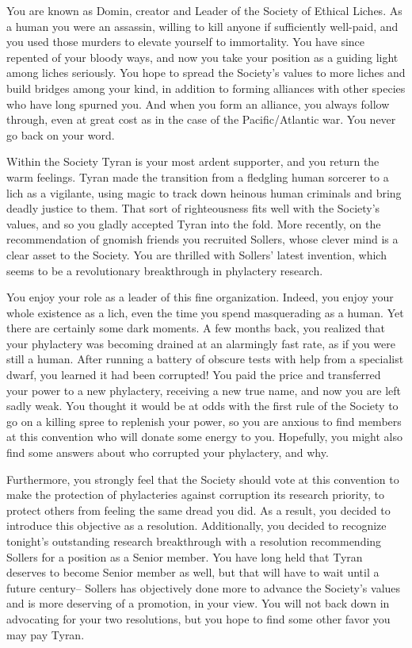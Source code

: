 \documentclass[char]{Sel}
\begin{document}
\name{\cDomin{}}


You are known as Domin, creator and Leader of the Society of Ethical Liches. As a human you were an assassin, willing to kill anyone if sufficiently well-paid, and you used those murders to elevate yourself to immortality. You have since repented of your bloody ways, and now you take your position as a guiding light among liches seriously. You hope to spread the Society's values to more liches and build bridges among your kind, in addition to forming alliances with other species who have long spurned you. And when you form an alliance, you always follow through, even at great cost as in the case of the Pacific/Atlantic war. You never go back on your word.

Within the Society Tyran is your most ardent supporter, and you return the warm feelings. Tyran made the transition from a fledgling human sorcerer to a lich as a vigilante, using magic to track down heinous human criminals and bring deadly justice to them. That sort of righteousness fits well with the Society's values, and so you gladly accepted Tyran into the fold. More recently, on the recommendation of gnomish friends you recruited Sollers, whose clever mind is a clear asset to the Society. You are thrilled with Sollers' latest invention, which seems to be a revolutionary breakthrough in phylactery research.

You enjoy your role as a leader of this fine organization. Indeed, you enjoy your whole existence as a lich, even the time you spend masquerading as a human. Yet there are certainly some dark moments. A few months back, you realized that your phylactery was becoming drained at an alarmingly fast rate, as if you were still a human. After running a battery of obscure tests with help from a specialist dwarf, you learned it had been corrupted! You paid the price and transferred your power to a new phylactery, receiving a new true name, and now you are left sadly weak. You thought it would be at odds with the first rule of the Society to go on a killing spree to replenish your power, so you are anxious to find members at this convention who will donate some energy to you. Hopefully, you might also find some answers about who corrupted your phylactery, and why.

Furthermore, you strongly feel that the Society should vote at this convention to make the protection of phylacteries against corruption its research priority, to protect others from feeling the same dread you did. As a result, you decided to introduce this objective as a resolution. Additionally, you decided to recognize tonight's outstanding research breakthrough with a resolution recommending Sollers for a position as a Senior member. You have long held that Tyran deserves to become Senior member as well, but that will have to wait until a future century-- Sollers has objectively done more to advance the Society's values and is more deserving of a promotion, in your view. You will not back down in advocating for your two resolutions, but you hope to find some other favor you may pay Tyran.
\end{document}
